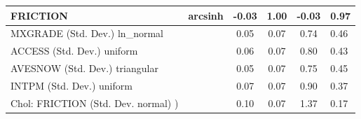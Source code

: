 \begin{table}
\begin{center}
\begin{tabular}{|l|l|c|c|c|l|}
			\hline
			FRICTION & arcsinh & -0.03 & 1.00 & -0.03 & 0.97 \\
			\hline
			MXGRADE (Std. Dev.) ln_normal &  & 0.05 & 0.07 & 0.74 & 0.46 \\
			\hline
			ACCESS (Std. Dev.) uniform &  & 0.06 & 0.07 & 0.80 & 0.43 \\
			\hline
			AVESNOW (Std. Dev.) triangular &  & 0.05 & 0.07 & 0.75 & 0.45 \\
			\hline
			INTPM (Std. Dev.) uniform &  & 0.07 & 0.07 & 0.90 & 0.37 \\
			\hline
			 Chol: FRICTION (Std. Dev. normal) ) &  & 0.10 & 0.07 & 1.37 & 0.17 \\
			\hline
		\end{tabular}
	\end{center}
\end{table}